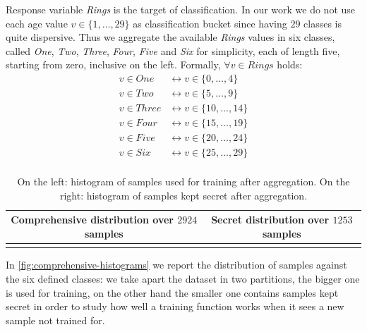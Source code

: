\documentclass[10pt,a4paper]{article}
\begin{document}
    Response variable \emph{Rings} is the target of classification. 
    In our work we do not use each age value $v \in \lbrace 1, \ldots, 29 \rbrace$ 
    as classification bucket since having $29$ classes is quite dispersive.
    Thus we aggregate the available \emph{Rings} values in six classes, called \emph{One},
    \emph{Two}, \emph{Three}, \emph{Four}, \emph{Five} and \emph{Six} for simplicity, each of length five, 
    starting from zero, inclusive on the left. Formally, $\forall v \in Rings$ holds: 
    \begin{displaymath}
        \begin{split}
                v \in One &\leftrightarrow v \in \lbrace 0, \ldots, 4 \rbrace \\
                v \in Two &\leftrightarrow v \in \lbrace 5, \ldots, 9 \rbrace \\
                v \in Three &\leftrightarrow v \in \lbrace 10, \ldots, 14 \rbrace \\
                v \in Four &\leftrightarrow v \in \lbrace 15, \ldots, 19 \rbrace \\
                v \in Five &\leftrightarrow v \in \lbrace 20, \ldots, 24 \rbrace \\
                v \in Six &\leftrightarrow v \in \lbrace 25, \ldots, 29 \rbrace \\
        \end{split}
    \end{displaymath}

    \begin{table}
        \begin{tabular}{ c | c }
            Comprehensive distribution over $2924$ samples  &   Secret distribution over $1253$ samples \\
            \hline 
             &  \\
            \hline
        \end{tabular}
      \caption{On the left: histogram of samples used for training after aggregation.
        On the right: histogram of samples kept secret after aggregation.}
      \label{fig:comprehensive-histograms}
    \end{table}

    In \autoref{fig:comprehensive-histograms} we report the distribution of samples against
    the six defined classes: we take apart the dataset in two partitions, the bigger one is
    used for training, on the other hand the smaller one contains samples kept secret
    in order to study how well a training function works when it sees a new sample not
    trained for.
\end{document}
